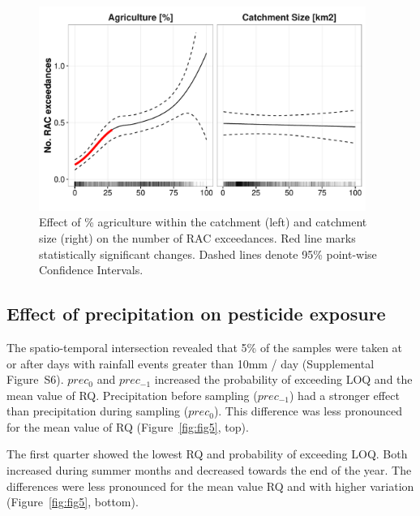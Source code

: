 \documentclass[journal=esthag,manuscript=article]{achemso}
\begin{document}
\begin{figure}[ht]
  \includegraphics[width=0.95\textwidth]{figure4.pdf}
  \caption{Effect of \% agriculture within the catchment (left) and catchment size (right) on the number of RAC exceedances. Red line marks statistically significant changes. Dashed lines denote 95\% point-wise Confidence Intervals.
  }
  \label{fig:fig4}
\end{figure}


\subsection{Effect of precipitation on pesticide exposure}
The spatio-temporal intersection revealed that 5\% of the samples were taken at or after days with rainfall events greater than 10mm / day (Supplemental Figure~S6).
$prec_{0}$ and $prec_{-1}$ increased the probability of exceeding LOQ and the mean value of RQ.
Precipitation before sampling ($prec_{-1}$) had a stronger effect than precipitation during sampling ($prec_{0}$). 
This difference was less pronounced for the mean value of RQ (Figure~\ref{fig:fig5}, top).

The first quarter showed the lowest RQ and probability of exceeding LOQ.
Both increased during summer months and decreased towards the end of the year.
The differences were less pronounced for the mean value RQ and with higher variation (Figure~\ref{fig:fig5}, bottom).
\end{document}
